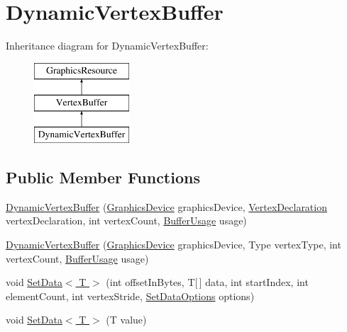 \hypertarget{classMicrosoft_1_1Xna_1_1Framework_1_1Graphics_1_1DynamicVertexBuffer}{}\section{Dynamic\+Vertex\+Buffer}
\label{classMicrosoft_1_1Xna_1_1Framework_1_1Graphics_1_1DynamicVertexBuffer}
Inheritance diagram for Dynamic\+Vertex\+Buffer\+:\begin{figure}[H]
\begin{center}
\leavevmode
\includegraphics[height=3.000000cm]{classMicrosoft_1_1Xna_1_1Framework_1_1Graphics_1_1DynamicVertexBuffer}
\end{center}
\end{figure}
\subsection*{Public Member Functions}
\begin{DoxyCompactItemize}
\item 
\hyperlink{classMicrosoft_1_1Xna_1_1Framework_1_1Graphics_1_1DynamicVertexBuffer_a62fe6fd524ea6e748b01b37a0859cbda}{Dynamic\+Vertex\+Buffer} (\hyperlink{classMicrosoft_1_1Xna_1_1Framework_1_1Graphics_1_1GraphicsDevice}{Graphics\+Device} graphics\+Device, \hyperlink{classMicrosoft_1_1Xna_1_1Framework_1_1Graphics_1_1VertexDeclaration}{Vertex\+Declaration} vertex\+Declaration, int vertex\+Count, \hyperlink{namespaceMicrosoft_1_1Xna_1_1Framework_1_1Graphics_a0d5d6ef0596e2ad7cfbd2b74cc19d3c2}{Buffer\+Usage} usage)
\item 
\hyperlink{classMicrosoft_1_1Xna_1_1Framework_1_1Graphics_1_1DynamicVertexBuffer_a8107a585936b306a4446cc2e7fbbc863}{Dynamic\+Vertex\+Buffer} (\hyperlink{classMicrosoft_1_1Xna_1_1Framework_1_1Graphics_1_1GraphicsDevice}{Graphics\+Device} graphics\+Device, Type vertex\+Type, int vertex\+Count, \hyperlink{namespaceMicrosoft_1_1Xna_1_1Framework_1_1Graphics_a0d5d6ef0596e2ad7cfbd2b74cc19d3c2}{Buffer\+Usage} usage)
\item 
void \hyperlink{classMicrosoft_1_1Xna_1_1Framework_1_1Graphics_1_1DynamicVertexBuffer_ae514d306971744f03416c749d258de0b}{Set\+Data$<$ T $>$} (int offset\+In\+Bytes, T\mbox{[}$\,$\mbox{]} data, int start\+Index, int element\+Count, int vertex\+Stride, \hyperlink{namespaceMicrosoft_1_1Xna_1_1Framework_1_1Graphics_a86dea9c1a1ceace47852674e1b9ce885}{Set\+Data\+Options} options)
\item 
void \hyperlink{classMicrosoft_1_1Xna_1_1Framework_1_1Graphics_1_1DynamicVertexBuffer_a03d462cb8e51c22424f43e8050524a53}{Set\+Data$<$ T $>$} (T value)
\end{DoxyCompactItemize}
